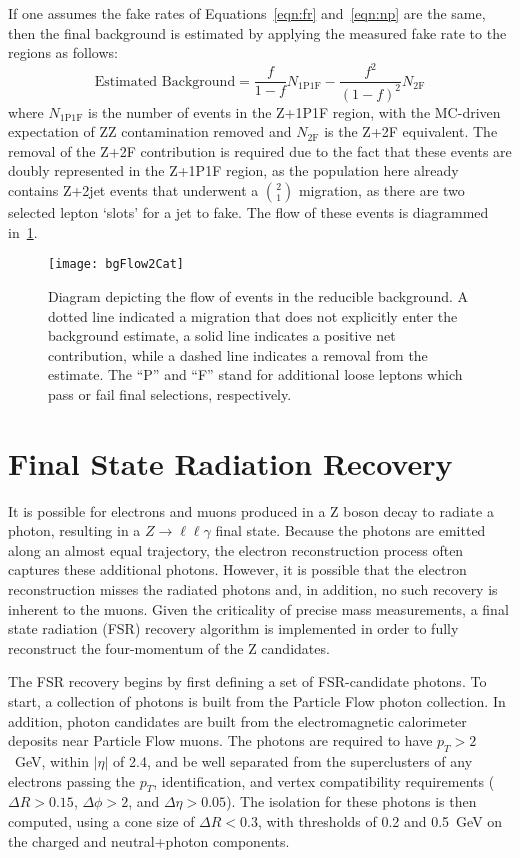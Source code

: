 If one assumes the fake rates of Equations~\ref{eqn:fr} and~\ref{eqn:np} are the
same, then the final background is estimated by applying the measured fake rate to
the regions as follows:
\begin{equation*}
    \textrm{Estimated Background} = \frac{f}{1-f}
    N_{\textrm{1P1F}} - \frac{f^2}{(1-f)^2} N_{\textrm{2F}}
\end{equation*}
where $N_{\textrm{1P1F}}$ is the number of events in the Z+1P1F region, with the
MC-driven expectation of ZZ contamination removed and $N_{\textrm{2F}}$ is the
Z+2F equivalent. The removal of the Z+2F contribution is required due to the
fact that these events are doubly represented in the Z+1P1F region, as the
population here already contains Z+2jet events that underwent a $2 \choose 1$
migration, as there are two selected lepton `slots' for a jet to fake. The flow
of these events is diagrammed in~\ref{fig:bgFlow}. 

\begin{figure}[h]
\centering
\texttt{[image: bgFlow2Cat]}
\caption[Diagram depicting the flow of events in the reducible background
estimate.]{Diagram depicting the flow of events in the reducible background. A
dotted line indicated a migration that does not explicitly enter the background
estimate, a solid line indicates a positive net contribution, while a dashed
line indicates a removal from the estimate. The ``P'' and ``F'' stand for
additional loose leptons which pass or fail final selections, respectively.}
\label{fig:bgFlow}
\end{figure}

\section{Final State Radiation Recovery}
It is possible for electrons and muons produced in a Z boson decay to radiate a
photon, resulting in a $Z\rightarrow \ell \ell \gamma$ final state. Because the
photons are emitted along an almost equal trajectory, the electron
reconstruction process often captures these additional photons. However, it is
possible that the electron reconstruction misses the radiated photons and, in
addition, no such recovery is inherent to the muons. Given the criticality of
precise mass measurements, a final state radiation (FSR) recovery algorithm is
implemented in order to fully reconstruct the four-momentum of the Z candidates. 

The FSR recovery begins by first defining a set of FSR-candidate photons. To
start, a collection of photons is built from the Particle Flow photon
collection. In addition, photon candidates are built from the electromagnetic
calorimeter deposits near Particle Flow muons. The photons are required to have
$p_T > 2$~GeV, within $|\eta|$ of 2.4, and be well separated from the
superclusters of any electrons passing the $p_T$, identification, and vertex
compatibility requirements ($\Delta R > 0.15$, $\Delta \phi > 2$, and $\Delta
\eta > 0.05$).  The isolation for these photons is then computed, using a cone
size of $\Delta R < 0.3$, with thresholds of 0.2 and 0.5~GeV on the charged and
neutral+photon components. 

